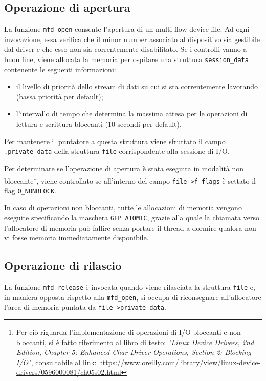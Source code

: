 \documentclass{article}
\begin{document}
\subsection{Operazione di apertura}
La funzione \texttt{mfd\_open} consente l'apertura di un multi-flow device file. Ad ogni invocazione, essa verifica che il minor number associato al dispositivo sia gestibile dal driver e che esso non sia correntemente disabilitato. Se i controlli vanno a buon fine, viene allocata la memoria per ospitare una struttura \texttt{session\_data} contenente le seguenti informazioni:
\begin{itemize}
\item il livello di priorità dello stream di dati su cui si sta correntemente lavorando (bassa priorità per default);
\item l'intervallo di tempo che determina la massima attesa per le operazioni di lettura e scrittura bloccanti (10 secondi per default).
\end{itemize}
Per mantenere il puntatore a questa struttura viene sfruttato il campo \texttt{.private\_data} della struttura \texttt{file} corrispondente alla sessione di I/O.

Per determinare se l'operazione di apertura è stata eseguita in modalità non bloccante\footnote{Per ciò riguarda l'implementazione di operazioni di I/O bloccanti e non bloccanti, si è fatto riferimento al libro di testo: \textit{"Linux Device Drivers, 2nd Edition, Chapter 5: Enhanced Char Driver Operations, Section 2: Blocking I/O"}, consultabile al link: \url{https://www.oreilly.com/library/view/linux-device-drivers/0596000081/ch05s02.html}}, viene controllato se all'interno del campo \texttt{file->f\_flags} è settato il flag \texttt{O\_NONBLOCK}.

In caso di operazioni non bloccanti, tutte le allocazioni di memoria vengono eseguite specificando la maschera \texttt{GFP\_ATOMIC}, grazie alla quale la chiamata verso l'allocatore di memoria può fallire senza portare il thread a dormire qualora non vi fosse memoria immediatamente disponibile.

\subsection{Operazione di rilascio}
La funzione \texttt{mfd\_release} è invocata quando viene rilasciata la struttura \texttt{file} e, in maniera opposta rispetto alla \texttt{mfd\_open}, si occupa di riconsegnare all'allocatore l'area di memoria puntata da \texttt{file->private\_data}.
\end{document}
